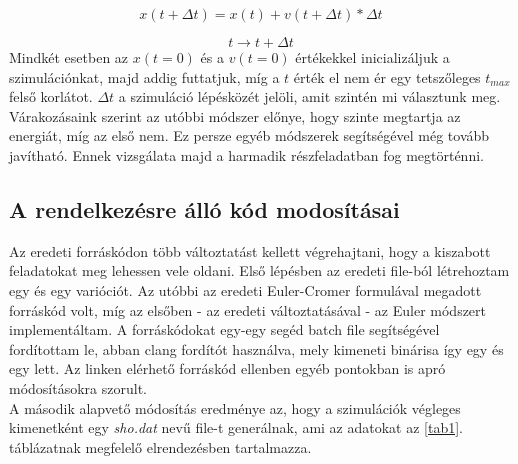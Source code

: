 \begin{multicols}{2}
\begin{equation}
    x \left(t + \Delta t \right) = x \left( t \right) + v \left( t + \Delta t \right) * \Delta t
\end{equation}

\begin{equation}
    t \to t + \Delta t
\end{equation}
Mindkét esetben az $x \left( t = 0 \right)$ és a $v \left( t = 0 \right)$ értékekkel inicializáljuk a szimulációnkat, majd addig futtatjuk, míg a $t$ érték el nem ér egy tetszőleges $t_{max}$ felső korlátot. $\Delta t$ a szimuláció lépésközét jelöli, amit szintén mi választunk meg. \\
Várakozásaink szerint az utóbbi módszer előnye, hogy szinte megtartja az energiát, míg az első nem\cite{cromer}. Ez persze egyéb módszerek segítségével még tovább javítható\cite{Iserles-2003}. Ennek vizsgálata majd a harmadik részfeladatban fog megtörténni.

\subsection{A rendelkezésre álló kód modosításai}
Az eredeti forráskódon több változtatást kellett végrehajtani, hogy a kiszabott feladatokat meg lehessen vele oldani. Első lépésben az eredeti  file-ból létrehoztam egy  és egy  varióciót. Az utóbbi az eredeti Euler-Cromer formulával megadott forráskód volt, míg az elsőben - az eredeti változtatásával - az Euler módszert implementáltam. A forráskódokat egy-egy segéd batch file segítségével fordítottam le, abban clang fordítót használva, mely kimeneti binárisa így egy  és egy  lett. Az \cite{szamszin} linken elérhető forráskód ellenben egyéb pontokban is apró módosításokra szorult. \\
A második alapvető módosítás eredménye az, hogy a szimulációk végleges kimenetként egy \emph{sho.dat} nevű file-t generálnak, ami az adatokat az \ref{tab1}. táblázatnak megfelelő elrendezésben tartalmazza.


\end{multicols}

